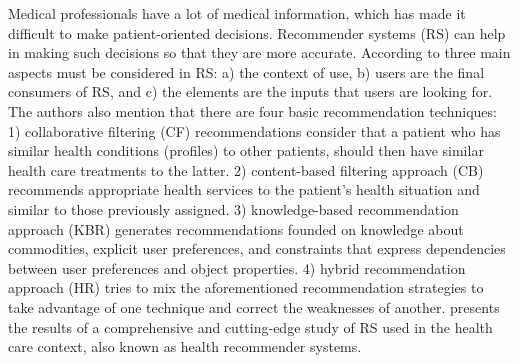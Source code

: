 \documentclass[sustainability,article,submit,pdftex,moreauthors]{Definitions/mdpi}
\begin{document}
Medical professionals have a lot of medical information, which has made it difficult to make patient-oriented decisions. Recommender systems (RS) can help in making such decisions so that they are more accurate. According to \citet{tran2021recommender} three main aspects must be considered in RS: a) the context of use, b) users are the final consumers of RS, and c) the elements are the inputs that users are looking for. The authors also mention that there are four basic recommendation techniques: 1) collaborative filtering (CF) recommendations consider that a patient who has similar health conditions (profiles) to other patients, should then have similar health care treatments to the latter. 2) content-based filtering approach (CB) recommends appropriate health services to the patient's health situation and similar to those previously assigned. 3) knowledge-based recommendation approach (KBR) generates recommendations founded on knowledge about commodities, explicit user preferences, and constraints that express dependencies between user preferences and object properties. 4) hybrid recommendation approach (HR) tries to mix the aforementioned recommendation strategies to take advantage of one technique and correct the weaknesses of another. \citet{pincay2019health} presents the results of a comprehensive and cutting-edge study of RS used in the health care context, also known as health recommender systems.
\end{document}
